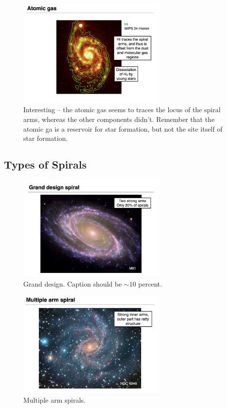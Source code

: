 \documentclass{article}
\begin{document}
\begin{figure}
    \centering
    \includegraphics[width=0.66\textwidth]{figs/Screen Shot 2021-10-27 at 9.57.28 AM.png}
    \caption{Interesting -- the atomic gas seems to traces the locus of the spiral arms, whereas the other components didn't. Remember that the atomic ga is a reservoir for star formation, but not the site itself of star formation. }
    \label{fig:locus}
\end{figure}

\subsection{Types of Spirals}

\begin{figure}
    \centering
    \includegraphics[width=0.66\textwidth]{figs/Screen Shot 2021-10-27 at 10.00.02 AM.png}
    \caption{Grand design. Caption should be $\sim 10$ percent. }
    \label{fig:Grand_design.}
\end{figure}

\begin{figure}
    \centering
    \includegraphics[width=0.66\textwidth]{figs/Screen Shot 2021-10-27 at 10.00.42 AM.png}
    \caption{Multiple arm spirals.}
    \label{fig:mutli_arm}
\end{figure}
\end{document}

